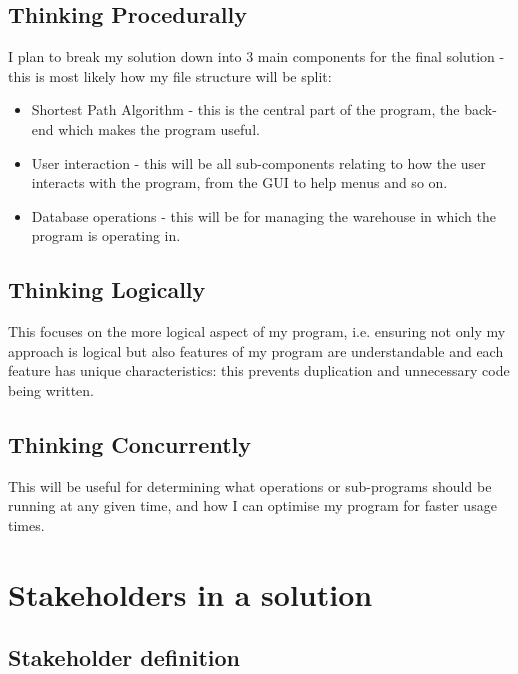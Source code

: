 \subsection{Thinking Procedurally}

I plan to break my solution down into 3 main components for the final solution - this is most likely how my file structure will be split:
\begin{itemize}
    \item Shortest Path Algorithm - this is the central part of the program, the back-end which makes the program useful.
    \item User interaction - this will be all sub-components relating to how the user interacts with the program, from the GUI to help menus and so on.
    \item Database operations - this will be for managing the warehouse in which the program is operating in.
\end{itemize}

\subsection{Thinking Logically}

This focuses on the more logical aspect of my program, i.e. ensuring not only my approach is logical but also features of my program are understandable and each feature has unique characteristics: this prevents duplication and unnecessary code being written.

\subsection{Thinking Concurrently}
This will be useful for determining what operations or sub-programs should be running at any given time, and how I can optimise my program for faster usage times.



\newpage


\section{Stakeholders in a solution} 

\subsection{Stakeholder definition}

